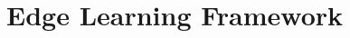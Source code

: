 \documentclass[../mthe-493-final-project.tex]{subfiles}
\begin{document}
    \chapter{Edge Learning Framework}
    \label{ch:edge-learning}
\end{document}
